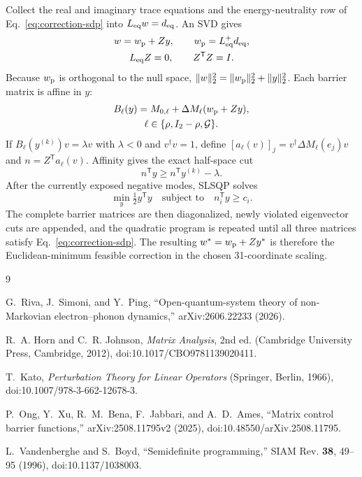 \documentclass[10pt,twocolumn]{article}
\newcommand{\I}{I}
\newcommand{\norm}[1]{\lVert#1\rVert}
\begin{document}
Collect the real and imaginary trace equations and the energy-neutrality row
of Eq.~\eqref{eq:correction-sdp} into
$L_{\rm eq}w=d_{\rm eq}$.  An SVD gives
\begin{equation}
\begin{gathered}
w=w_{\rm p}+Zy,\qquad w_{\rm p}=L_{\rm eq}^{+}d_{\rm eq},\\
L_{\rm eq}Z=0,\qquad Z^{\mathsf T}Z=\I.
\end{gathered}
\label{eq:nullspace}
\end{equation}
Because $w_{\rm p}$ is orthogonal to the null space,
$\norm{w}_2^2=\norm{w_{\rm p}}_2^2+\norm y_2^2$.  Each barrier matrix is
affine in $y$:
\begin{equation}
\begin{gathered}
B_\ell(y)=M_{0,\ell}+\Delta M_\ell(w_{\rm p}+Zy),\\
\ell\in\{\rho,\I_2-\rho,\mathcal G\}.
\end{gathered}
\label{eq:affine-barrier}
\end{equation}
If $B_\ell(y^{(k)})v=\lambda v$ with $\lambda<0$ and $v^\dagger v=1$, define
$[a_\ell(v)]_j=v^\dagger\Delta M_\ell(e_j)v$ and
$n=Z^{\mathsf T}a_\ell(v)$.  Affinity gives the exact half-space cut
\begin{equation}
n^{\mathsf T}y\geq n^{\mathsf T}y^{(k)}-\lambda.
\label{eq:eigenvector-cut}
\end{equation}
After the currently exposed negative modes, SLSQP solves
\begin{equation}
\min_y\tfrac12y^{\mathsf T}y
\quad\text{subject to}\quad n_i^{\mathsf T}y\geq c_i.
\label{eq:cutting-plane-qp}
\end{equation}
The complete barrier matrices are then diagonalized, newly violated
eigenvector cuts are appended, and the quadratic program is repeated until
all three matrices satisfy Eq.~\eqref{eq:correction-sdp}.  The resulting
$w^*=w_{\rm p}+Zy^*$ is therefore the Euclidean-minimum feasible correction
in the chosen 31-coordinate scaling.

\begin{thebibliography}{9}
\small
\raggedright

G.~Riva, J.~Simoni, and Y.~Ping,
``Open-quantum-system theory of non-Markovian electron--phonon dynamics,''
arXiv:2606.22233 (2026).

R.~A. Horn and C.~R. Johnson,
\emph{Matrix Analysis}, 2nd ed. (Cambridge University Press, Cambridge,
2012), doi:10.1017/CBO9781139020411.

T.~Kato, \emph{Perturbation Theory for Linear Operators}
(Springer, Berlin, 1966), doi:10.1007/978-3-662-12678-3.

P.~Ong, Y.~Xu, R.~M.~Bena, F.~Jabbari, and A.~D.~Ames,
``Matrix control barrier functions,'' arXiv:2508.11795v2 (2025),
doi:10.48550/arXiv.2508.11795.

L.~Vandenberghe and S.~Boyd, ``Semidefinite programming,''
SIAM Rev. \textbf{38}, 49--95 (1996), doi:10.1137/1038003.

\end{thebibliography}
\end{document}
